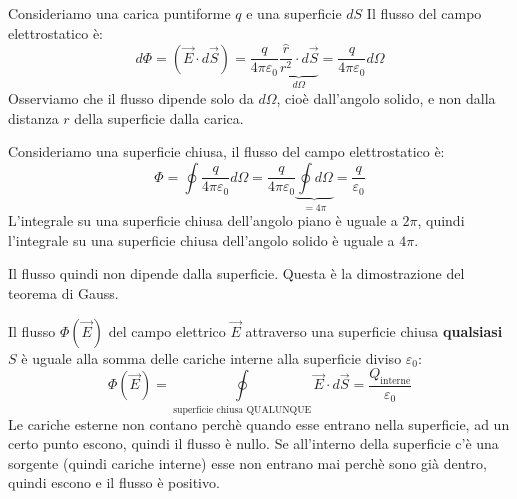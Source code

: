 \documentclass[a4paper]{article}
\begin{document}
\begin{example}
  Consideriamo una carica puntiforme \( q \) e una superficie \( dS \) 
  \label{14-03-D4}
  Il flusso del campo elettrostatico è:
  \[
    d \Phi = \left( \vec{E} \cdot d\vec{S} \right) = \frac{q}{4 \pi \varepsilon_0} 
    \underbrace{\frac{\hat{r}}{r^2} \cdot d\vec{S}}_{d \Omega} = \frac{q}{4 \pi \varepsilon_0}
    d \Omega
  \] 
  Osserviamo che il flusso dipende solo da \( d \Omega \), cioè dall'angolo solido,
  e non dalla distanza \( r \) della superficie dalla carica.
\end{example}
\begin{example}
  Consideriamo una superficie chiusa, il flusso del campo elettrostatico è:
  \[
    \Phi = \oint \frac{q}{4 \pi \varepsilon_0} d \Omega = \frac{q}{4 \pi \varepsilon_0}
    \underbrace{\oint d \Omega}_{= 4 \pi} = \frac{q}{\varepsilon_0}
  \] 
  L'integrale su una superficie chiusa dell'angolo piano è uguale a \( 2 \pi  \),
  quindi l'integrale su una superficie chiusa dell'angolo solido è uguale a \( 4 \pi \).

  \vspace{1em}
  \noindent
\end{example}
Il flusso quindi non dipende dalla superficie. Questa è la dimostrazione del teorema
di Gauss.

\begin{theorem}
  Il flusso \( \Phi(\vec{E}) \) del campo elettrico \( \vec{E} \) attraverso una
  superficie chiusa \textbf{qualsiasi} \( S \) è uguale alla somma delle cariche interne alla superficie
  diviso \( \varepsilon_0 \):
  \[
    \Phi (\vec{E}) = \underset{\text{superficie chiusa QUALUNQUE}}{\oint} \vec{E} \cdot d \vec{S} = \frac{Q_{\text{interne}}}{\varepsilon_0}
  \] 
  Le cariche esterne non contano perchè quando esse entrano nella superficie, ad un
  certo punto escono, quindi il flusso è nullo. Se all'interno della superficie c'è
  una sorgente (quindi cariche interne) esse non entrano mai perchè sono già dentro,
  quindi escono e il flusso è positivo.
\end{theorem}
\end{document}
